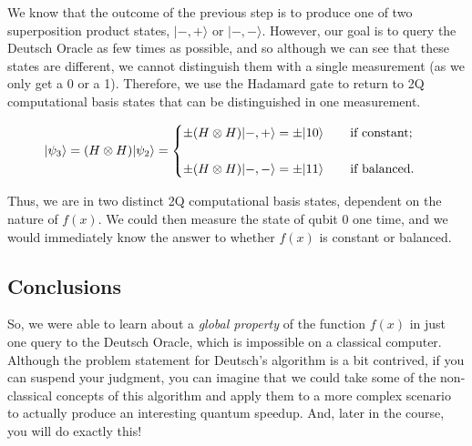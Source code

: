 \documentclass[12pt, letterpaper]{article}
\begin{document}
We know that the outcome of the previous step is to produce one of two superposition product states, $|-, +\rangle$ or $|-, -\rangle$. However, our goal is to query the Deutsch Oracle as few times as possible, and so although we can see that these states are different, we cannot distinguish them with a single measurement (as we only get a 0 or a 1). Therefore, we use the Hadamard gate to return to 2Q computational basis states that can be distinguished in one measurement.

\begin{equation}
|\psi_3\rangle = (H \otimes H)|\psi_2\rangle =
\begin{cases}
   \pm (H \otimes H)|-, +\rangle = \pm |10\rangle \text{ \hspace{5 mm} if constant;}\\
   \\
   \pm (H \otimes H)|-, -\rangle = \pm |11\rangle \text{ \hspace{5 mm} if balanced.}
\end{cases}
\end{equation}
\vspace{1 mm}

\noindent
Thus, we are in two distinct 2Q computational basis states, dependent on the nature of $f(x)$. We could then measure the state of qubit 0 one time, and we would immediately know the answer to whether $f(x)$ is constant or balanced.

\subsection{Conclusions}

So, we were able to learn about a \textit{global property} of the function $f(x)$ in just one query to the Deutsch Oracle, which is impossible on a classical computer. Although the problem statement for Deutsch's algorithm is a bit contrived, if you can suspend your judgment, you can imagine that we could take some of the non-classical concepts of this algorithm and apply them to a more complex scenario to actually produce an interesting quantum speedup. And, later in the course, you will do exactly this!
\end{document}
